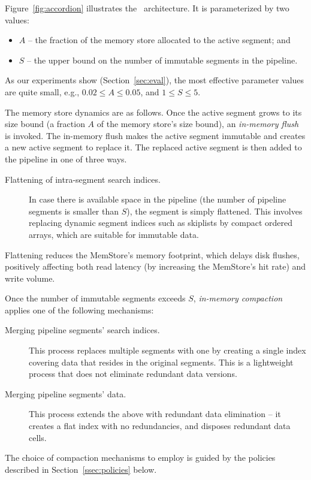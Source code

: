  Figure~\ref{fig:accordion} illustrates the \sys\ architecture. It is parameterized by two values:
\begin{itemize}
\item  $A$ -- the fraction of the memory store allocated to the active segment; and 
\item $S$ -- the upper bound on the number of immutable segments in the pipeline. 
\end{itemize}

\noindent
As our experiments show (Section~\ref{sec:eval}), the most effective parameter values are quite small, 
e.g., $0.02 \leq A \leq 0.05$, and $1 \leq S \leq 5$.

The memory store dynamics are as follows. 
Once the active segment grows to its size bound (a fraction $A$ of the memory store's size bound), an \emph{in-memory flush} is invoked.
The in-memory flush makes the active segment immutable and creates a new active segment to replace it. 
The replaced active segment is then added to the pipeline in one of three ways. 
\begin{description}
\item[Flattening of intra-segment search indices.] 
In case there is available space in the pipeline (the number of pipeline segments is smaller than $S$), 
the segment is simply flattened. This involves replacing dynamic segment indices such as skiplists by 
compact ordered arrays, which are suitable for immutable data. 
\end{description}
Flattening reduces the MemStore's memory footprint, which delays  disk flushes, positively affecting both read latency  (by increasing the MemStore's hit rate) and write volume.

Once the number of immutable segments exceeds $S$, \emph{in-memory compaction} applies one of the following mechanisms: 
\begin{description}
\item[Merging pipeline segments' search indices.]
This process replaces multiple segments with one by creating a single index covering data that resides 
in the original segments. This is a lightweight process that does not eliminate redundant 
data versions.
\item[Merging pipeline segments' data.]
This process extends the above with redundant data elimination -- it 
creates a flat index with no redundancies, and disposes redundant data cells. 
\end{description} 
The choice of compaction mechanisms to employ is guided by the policies described in Section~\ref{ssec:policies} below.

